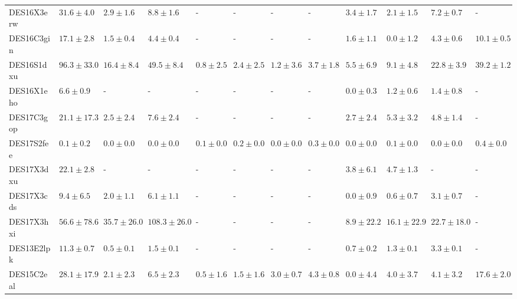 \documentclass[fleqn,usenatbib,]{mnras}
\begin{document}
\begin{table}
\begin{tabular}{llllllllllll}
DES16X3erw &   $31.6 \pm 4.0$ &    $2.9 \pm 1.6$ &     $8.8 \pm 1.6$ &               - &               - &               - &               - &   $3.4 \pm 1.7$ &    $2.1 \pm 1.5$ &    $7.2 \pm 0.7$ &                - \\
DES16C3gin &   $17.1 \pm 2.8$ &    $1.5 \pm 0.4$ &     $4.4 \pm 0.4$ &               - &               - &               - &               - &   $1.6 \pm 1.1$ &    $0.0 \pm 1.2$ &    $4.3 \pm 0.6$ &   $10.1 \pm 0.5$ \\
DES16S1dxu &  $96.3 \pm 33.0$ &   $16.4 \pm 8.4$ &    $49.5 \pm 8.4$ &   $0.8 \pm 2.5$ &   $2.4 \pm 2.5$ &   $1.2 \pm 3.6$ &   $3.7 \pm 1.8$ &   $5.5 \pm 6.9$ &    $9.1 \pm 4.8$ &   $22.8 \pm 3.9$ &   $39.2 \pm 1.2$ \\
DES16X1eho &    $6.6 \pm 0.9$ &                - &                 - &               - &               - &               - &               - &   $0.0 \pm 0.3$ &    $1.2 \pm 0.6$ &    $1.4 \pm 0.8$ &                - \\
DES17C3gop &  $21.1 \pm 17.3$ &    $2.5 \pm 2.4$ &     $7.6 \pm 2.4$ &               - &               - &               - &               - &   $2.7 \pm 2.4$ &    $5.3 \pm 3.2$ &    $4.8 \pm 1.4$ &                - \\
DES17S2fee &    $0.1 \pm 0.2$ &    $0.0 \pm 0.0$ &     $0.0 \pm 0.0$ &   $0.1 \pm 0.0$ &   $0.2 \pm 0.0$ &   $0.0 \pm 0.0$ &   $0.3 \pm 0.0$ &   $0.0 \pm 0.0$ &    $0.1 \pm 0.0$ &    $0.0 \pm 0.0$ &    $0.4 \pm 0.0$ \\
DES17X3dxu &   $22.1 \pm 2.8$ &                - &                 - &               - &               - &               - &               - &   $3.8 \pm 6.1$ &    $4.7 \pm 1.3$ &                - &                - \\
DES17X3cds &    $9.4 \pm 6.5$ &    $2.0 \pm 1.1$ &     $6.1 \pm 1.1$ &               - &               - &               - &               - &   $0.0 \pm 0.9$ &    $0.6 \pm 0.7$ &    $3.1 \pm 0.7$ &                - \\
DES17X3hxi &  $56.6 \pm 78.6$ &  $35.7 \pm 26.0$ &  $108.3 \pm 26.0$ &               - &               - &               - &               - &  $8.9 \pm 22.2$ &  $16.1 \pm 22.9$ &  $22.7 \pm 18.0$ &                - \\
DES13E2lpk &   $11.3 \pm 0.7$ &    $0.5 \pm 0.1$ &     $1.5 \pm 0.1$ &               - &               - &               - &               - &   $0.7 \pm 0.2$ &    $1.3 \pm 0.1$ &    $3.3 \pm 0.1$ &                - \\
DES15C2eal &  $28.1 \pm 17.9$ &    $2.1 \pm 2.3$ &     $6.5 \pm 2.3$ &   $0.5 \pm 1.6$ &   $1.5 \pm 1.6$ &   $3.0 \pm 0.7$ &   $4.3 \pm 0.8$ &   $0.0 \pm 4.4$ &    $4.0 \pm 3.7$ &    $4.1 \pm 3.2$ &   $17.6 \pm 2.0$ \\

\end{tabular}
\end{table}
\end{document}
